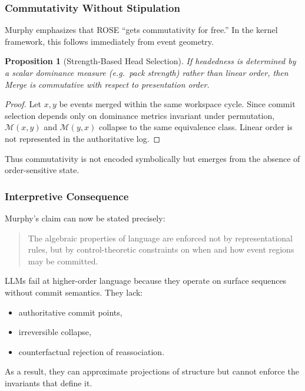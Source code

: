 \documentclass[11pt]{article}
\newtheorem{proposition}{Proposition}
\begin{document}
\subsubsection{Commutativity Without Stipulation}

Murphy emphasizes that ROSE “gets commutativity for free.” In the kernel framework, this follows immediately from event geometry.

\begin{proposition}[Strength-Based Head Selection]
\label{prop:comm_free}
If headedness is determined by a scalar dominance measure (e.g.\ pack strength) rather than linear order, then Merge is commutative with respect to presentation order.
\end{proposition}

\begin{proof}
Let $x,y$ be events merged within the same workspace cycle. Since commit selection depends only on dominance metrics invariant under permutation, $\mathcal{M}(x,y)$ and $\mathcal{M}(y,x)$ collapse to the same equivalence class. Linear order is not represented in the authoritative log.
\end{proof}

Thus commutativity is not encoded symbolically but emerges from the absence of order-sensitive state.

\subsubsection{Interpretive Consequence}

Murphy’s claim can now be stated precisely:

\begin{quote}
The algebraic properties of language are enforced not by representational rules, but by control-theoretic constraints on when and how event regions may be committed.
\end{quote}

LLMs fail at higher-order language because they operate on surface sequences without commit semantics. They lack:
\begin{itemize}
  \item authoritative commit points,
  \item irreversible collapse,
  \item counterfactual rejection of reassociation.
\end{itemize}

As a result, they can approximate projections of structure but cannot enforce the invariants that define it.
\end{document}
